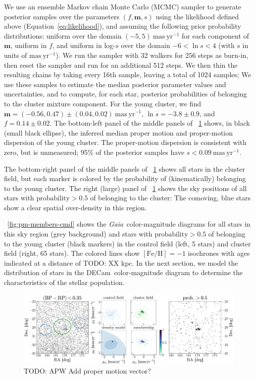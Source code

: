 \documentclass[modern]{aastex62}
\newcommand{\gaia}{\textsl{Gaia}}
\newcommand{\decam}{DECam}
\newcommand{\todo}[1]{{\color{red} TODO: #1}}
\newcommand{\bs}[1]{\boldsymbol{#1}}
\newcommand{\kpc}{\textrm{kpc}}
\newcommand{\masyr}{\ensuremath{\textrm{mas}~\textrm{yr}^{-1}}}
\newcommand{\feh}{\ensuremath{[\textrm{Fe} / \textrm{H}]}}
\begin{document}
We use an ensemble Markov chain Monte Carlo (MCMC) sampler \citep[\texttt{emcee};][]{Goodman:XX, Foreman-Mackey:2013} to generate posterior samples over the parameters $(f, \bs{m}, s)$ using the likelihood defined above (Equation~\ref{eq:likelihood}), and assuming the following prior probability distributions: uniform over the domain $(-5, 5)~\masyr$ for each component of $\bs{m}$, uniform in $f$, and uniform in log-$s$ over the domain $-6 < \ln s < 4$ (with $s$ in units of \masyr).
We run the sampler with 32 walkers for 256 steps as burn-in, then reset the sampler and run for an additional 512 steps.
We then thin the resulting chains by taking every 16th sample, leaving a total of 1024 samples; We use these samples to estimate the median posterior parameter values and uncertainties, and to compute, for each star, posterior probabilities of belonging to the cluster mixture component.
For the young cluster, we find $\bs{m} = (-0.56,  0.47) \pm (0.04, 0.02)~\masyr$, $\ln s = -3.8 \pm 0.9$, and $f = 0.14 \pm 0.02$.
The bottom-left panel of the middle panels of \figurename~\ref{fig:pm-members} shows, in black (small black ellipse), the inferred median proper motion and proper-motion dispersion of the young cluster.
The proper-motion dispersion is consistent with zero, but is unmeasured; 95\% of the posterior samples have $s < 0.09~\masyr$.

The bottom-right panel of the middle panels of \figurename~\ref{fig:pm-members} shows all stars in the cluster field, but each marker is colored by the probability of (kinematically) belonging to the young cluster.
The right (large) panel of \figurename~\ref{fig:pm-members} shows the sky positions of all stars with $\textrm{probability} > 0.5$ of belonging to the cluster: The comoving, blue stars show a clear spatial over-density in this region.

\figurename~\ref{fig:pm-members-cmd} shows the \gaia\ color-magnitude diagrams for all stars in this sky region (grey background) and stars with $\text{probability} > 0.5$ of belonging to the young cluster (black markers) in the control field (left, 5 stars) and cluster field (right, 65 stars).
The colored lines show $\feh = -1$ isochrones with ages indicated at a distance of \todo{XX} \kpc.
In the next section, we model the distribution of stars in the \decam\ color-magnitude diagram to determine the characteristics of the stellar population.

\begin{figure}
\centering
\includegraphics[width=\textwidth]{figures/pm-model.pdf}
\caption{\todo{APW}
Add proper motion vector?}
\label{fig:pm-members}
\end{figure}
\end{document}
